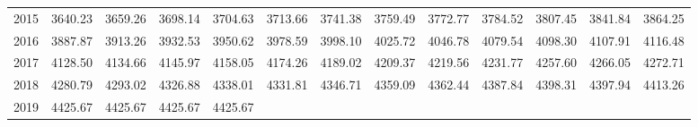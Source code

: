 \begin{longtable}{rrrrrrrrrrrrr}
  2015 & 3640.23 & 3659.26 & 3698.14 & 3704.63 & 3713.66 & 3741.38 & 3759.49 & 3772.77 & 3784.52 & 3807.45 & 3841.84 & 3864.25 \\ 
  2016 & 3887.87 & 3913.26 & 3932.53 & 3950.62 & 3978.59 & 3998.10 & 4025.72 & 4046.78 & 4079.54 & 4098.30 & 4107.91 & 4116.48 \\ 
  2017 & 4128.50 & 4134.66 & 4145.97 & 4158.05 & 4174.26 & 4189.02 & 4209.37 & 4219.56 & 4231.77 & 4257.60 & 4266.05 & 4272.71 \\ 
  2018 & 4280.79 & 4293.02 & 4326.88 & 4338.01 & 4331.81 & 4346.71 & 4359.09 & 4362.44 & 4387.84 & 4398.31 & 4397.94 & 4413.26 \\ 
  2019 & 4425.67 & 4425.67 & 4425.67 & 4425.67 &  &  &  &  &  &  &  &  \\ 
   \hline
\hline
\end{longtable}
